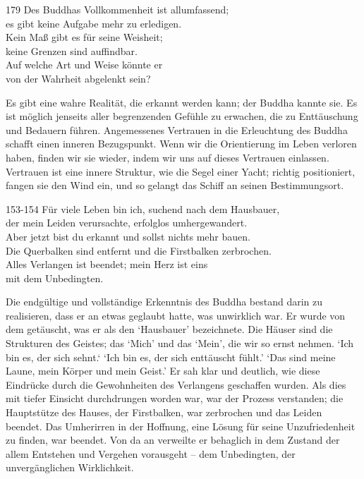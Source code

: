 
\begin{dhpVerse}{179}
\label{dhp-179}
Des Buddhas Vollkommenheit ist allumfassend;\\ 
es gibt keine Aufgabe mehr zu erledigen.\\ 
Kein Maß gibt es für seine Weisheit;\\ 
keine Grenzen sind auffindbar.\\ 
Auf welche Art und Weise könnte er\\ 
von der Wahrheit abgelenkt sein? 
\end{dhpVerse}

\begin{dhpRefl}

Es gibt eine wahre Realität, die erkannt werden kann; der Buddha kannte sie.
Es ist möglich jenseits aller begrenzenden Gefühle zu erwachen, die zu
Enttäuschung und Bedauern führen. Angemessenes Vertrauen in die Erleuchtung
des Buddha schafft einen inneren Bezugspunkt. Wenn wir die Orientierung im
Leben verloren haben, finden wir sie wieder, indem wir uns auf dieses
Vertrauen einlassen. Vertrauen ist eine innere Struktur, wie die Segel einer
Yacht; richtig positioniert, fangen sie den Wind ein, und so gelangt das Schiff
an seinen Bestimmungsort.

\end{dhpRefl}


\begin{dhpVerse}{153-154}
\label{dhp-153}\label{dhp-154}
Für viele Leben bin ich, suchend nach dem Hausbauer,\\ 
der mein Leiden verursachte, erfolglos umhergewandert.\\ 
Aber jetzt bist du erkannt und sollst nichts mehr bauen.\\ 
Die Querbalken sind entfernt und die Firstbalken zerbrochen.\\ 
Alles Verlangen ist beendet; mein Herz ist eins\\ 
mit dem Unbedingten. 
\end{dhpVerse}

\begin{dhpRefl}

Die endgültige und vollständige Erkenntnis des Buddha bestand darin zu
realisieren, dass er an etwas geglaubt hatte, was unwirklich war. Er wurde von
dem getäuscht, was er als den `Hausbauer' bezeichnete. Die Häuser sind die
Strukturen des Geistes; das `Mich' und das `Mein', die wir so ernst nehmen.
`Ich bin es, der sich sehnt.‘ `Ich bin es, der sich enttäuscht fühlt.’ `Das
sind meine Laune, mein Körper und mein Geist.’ Er sah klar und deutlich, wie
diese Eindrücke durch die Gewohnheiten des Verlangens geschaffen wurden. Als
dies mit tiefer Einsicht durchdrungen worden war, war der Prozess verstanden;
die Hauptstütze des Hauses, der Firstbalken, war zerbrochen und das Leiden
beendet. Das Umherirren in der Hoffnung, eine Lösung für seine Unzufriedenheit
zu finden, war beendet. Von da an verweilte er behaglich in dem Zustand der
allem Entstehen und Vergehen vorausgeht -- dem Unbedingten, der
unvergänglichen Wirklichkeit.

\end{dhpRefl}
